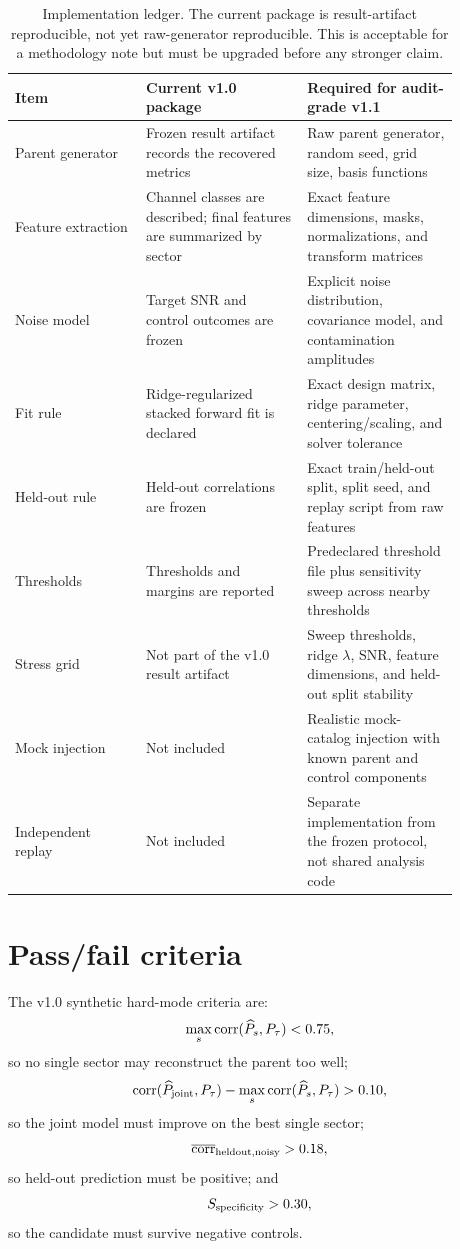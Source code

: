 \documentclass[12pt]{article}
\begin{document}
\begin{table}[t]
\centering
\small
\begin{tabular}{L{0.26\linewidth}L{0.32\linewidth}L{0.30\linewidth}}
\toprule
Item & Current v1.0 package & Required for audit-grade v1.1\\
\midrule
Parent generator & Frozen result artifact records the recovered metrics &
Raw parent generator, random seed, grid size, basis functions\\
Feature extraction & Channel classes are described; final features are
summarized by sector & Exact feature dimensions, masks, normalizations, and
transform matrices\\
Noise model & Target SNR and control outcomes are frozen & Explicit noise
distribution, covariance model, and contamination amplitudes\\
Fit rule & Ridge-regularized stacked forward fit is declared & Exact design
matrix, ridge parameter, centering/scaling, and solver tolerance\\
Held-out rule & Held-out correlations are frozen & Exact train/held-out split,
split seed, and replay script from raw features\\
Thresholds & Thresholds and margins are reported & Predeclared threshold file
plus sensitivity sweep across nearby thresholds\\
Stress grid & Not part of the v1.0 result artifact & Sweep thresholds, ridge
\(\lambda\), SNR, feature dimensions, and held-out split stability\\
Mock injection & Not included & Realistic mock-catalog injection with known
parent and control components\\
Independent replay & Not included & Separate implementation from the frozen
protocol, not shared analysis code\\
\bottomrule
\end{tabular}
\caption{Implementation ledger.  The current package is result-artifact
reproducible, not yet raw-generator reproducible.  This is acceptable for a
methodology note but must be upgraded before any stronger claim.}
\label{tab:implementation-ledger}
\end{table}

\section{Pass/fail criteria}

The v1.0 synthetic hard-mode criteria are:
\[
  \max_s {\rm corr}(\widehat P_s,P_{\tau}) < 0.75,
  \label{eq:single-suppression}
\]
so no single sector may reconstruct the parent too well;
\[
  {\rm corr}(\widehat P_{\rm joint},P_{\tau})
  -
  \max_s {\rm corr}(\widehat P_s,P_{\tau})
  >0.10,
  \label{eq:joint-gain}
\]
so the joint model must improve on the best single sector;
\[
  \overline{{\rm corr}}_{\rm heldout,noisy}>0.18,
  \label{eq:heldout}
\]
so held-out prediction must be positive; and
\[
  S_{\rm specificity}>0.30,
  \label{eq:specificity-threshold}
\]
so the candidate must survive negative controls.
\end{document}
